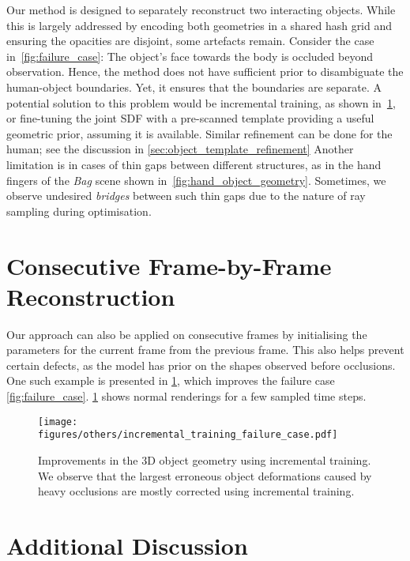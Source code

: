 Our method is designed to separately reconstruct two interacting objects. 
While this is largely addressed by encoding both geometries in a shared hash grid and ensuring the opacities are disjoint, some artefacts remain.
Consider the case in~\cref{fig:failure_case}: 
The object's face towards the body is occluded beyond observation.  
Hence, the method does not have sufficient prior to disambiguate the human-object boundaries.  
Yet, it ensures that the boundaries are separate. 
A potential solution to this problem would be incremental training, as shown in~\cref{fig:incr_failure_case}, or fine-tuning the joint SDF with a pre-scanned template providing a useful geometric prior, assuming it is available. 
Similar refinement can be done for the human; see the discussion in \cref{sec:object_template_refinement}
Another limitation is in cases of thin gaps between different structures, as in the hand fingers of the \textit{Bag}            scene shown in~\cref{fig:hand_object_geometry}. 
Sometimes, we observe undesired \textit{bridges} between such thin gaps due to the nature of ray sampling during optimisation. 

\section{Consecutive Frame-by-Frame Reconstruction} 
\label{sec:incr_training}
Our approach can also be applied on consecutive frames by initialising the parameters for the current frame from the previous frame. 
This also helps prevent certain defects, as the model has prior on the shapes observed before occlusions. 
One such example is presented in \cref{fig:incr_failure_case}, which improves the failure case \cref{fig:failure_case}. \cref{fig:incr_failure_case} shows normal renderings for a few sampled time steps.
\label{sec:suppl_incr_training}
\begin{figure}[h]
    \centering
    \texttt{[image: figures/others/incremental\_training\_failure\_case.pdf]}
    \caption{
    Improvements in the 3D object geometry using incremental training. 
    We observe that the largest erroneous object deformations caused by heavy occlusions are mostly corrected using incremental training.}
    \label{fig:incr_failure_case}
\end{figure}
\section{Additional Discussion}
